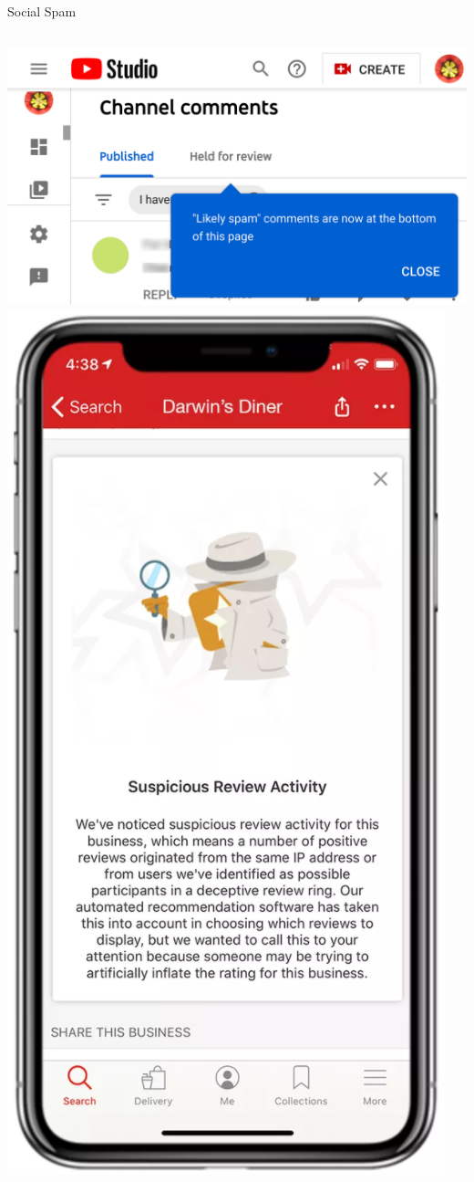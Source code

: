 \documentclass[nobackground,dvipsnames,table,aspectratio=169]{beamer}
\begin{document}
\begin{frame}{Social Spam}
    \begin{columns}
            \includegraphics[width=\textwidth]{yt-social-spam}
            \includegraphics[width=\textwidth]{yelp-spam}

\end{columns}
\end{frame}
\end{document}
